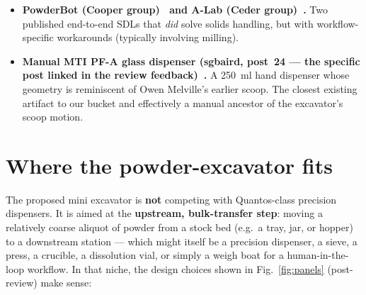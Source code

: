 \documentclass[11pt,a4paper]{article}
\begin{document}
\begin{itemize}[leftmargin=*]
    Pico W; community-validated reference for the ``scale + metered feed''
    downstream of a bulk-transfer device. Suggests a concrete integration
    target: excavator $\rightarrow$ tared Autotrickler-style
    trickler/scale.
  \item \textbf{PowderBot (Cooper group)~\cite{jiang2023autonomousbiomimeticsolid}
    and A-Lab (Ceder
    group)~\cite{szymanski2023anautonomouslaboratory,fei2024alabosapythonbased}.}
    Two published end-to-end SDLs that \emph{did} solve solids handling, but
    with workflow-specific workarounds (typically involving milling).
  \item \textbf{Manual MTI PF-A glass dispenser (sgbaird, post~24 --- the
    specific post linked in the review feedback)~\cite{mtipfaglassdispenser}.}
    A \SI{250}{\milli\litre} hand dispenser whose geometry is reminiscent
    of Owen Melville's earlier scoop. The closest existing artifact to our
    bucket and effectively a manual ancestor of the excavator's scoop motion.
\end{itemize}

\section{Where the powder-excavator fits}
\label{sec:fits}

The proposed mini excavator is \textbf{not} competing with Quantos-class
precision dispensers. It is aimed at the \textbf{upstream, bulk-transfer
step}: moving a relatively coarse aliquot of powder from a stock bed (e.g.\
a tray, jar, or hopper) to a downstream station --- which might itself be
a precision dispenser, a sieve, a press, a crucible, a dissolution vial,
or simply a weigh boat for a human-in-the-loop workflow. In that niche, the
design choices shown in Fig.~\ref{fig:panels} (post-review) make sense:
\end{document}
